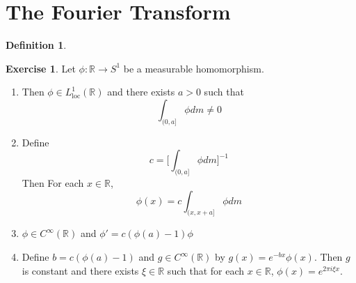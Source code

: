 \documentclass{book}
\theoremstyle{definition}
\newtheorem{defn}[definition]{Definition}
\newtheorem{ex}[definition]{Exercise}
\newcommand{\R}{\mathbb{R}}
\newcommand{\lex}[1]{\label{ex:#1}}
\DeclareMathOperator*{\0}{\mbf{0}}
\DeclareMathOperator*{\1}{\mbf{1}}
\newcommand{\loc}{\text{loc}}
\begin{document}
	
	
	
	
	
	
	
	
	\newpage
	\section{The Fourier Transform}
	
	\begin{defn}
	
	\end{defn}	
	
	\begin{ex}
	\lex{300} Let $\phi:\R \rightarrow S^1$ be a measurable homomorphism. 
	\begin{enumerate}
	\item Then $\phi \in L^1_{\loc}(\R)$ and there exists $a > 0$ such that $$\int_{(0,a]}\phi dm \neq 0$$
	\item Define $$c = \bigg[ \int_{(0,a]}\phi dm \bigg]^{-1}$$ 
	Then  For each $x \in \R$, $$\phi(x) = c\int_{(x, x+a]}\phi dm$$ 
	\item $\phi \in C^{\infty}(\R)$ and $\phi' = c(\phi(a) - 1)\phi$
	\item Define $b = c(\phi(a) - 1)$ and $g \in C^{\infty}(\R)$ by $g(x) = e^{-bx} \phi(x)$. Then $g$ is constant and there exists $\xi \in \R$ such that for each $x \in \R$, $\phi(x) = e^{2 \pi i \xi x}$.
	\end{enumerate}
	\end{ex}	
	
\end{document}
